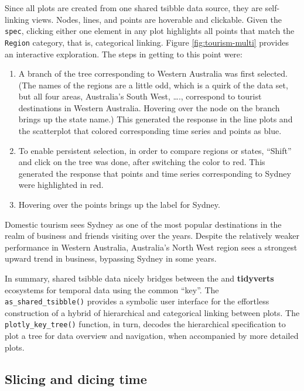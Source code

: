Since all plots are created from one shared tsibble data source, they
are self-linking views. Nodes, lines, and points are hoverable and
clickable. Given the \texttt{spec}, clicking either one element in any
plot highlights all points that match the \texttt{Region} category, that
is, categorical linking. Figure \ref{fig:tourism-multi} provides an
interactive exploration. The steps in getting to this point were:

\begin{enumerate}
\def\labelenumi{\arabic{enumi}.}
\tightlist
\item
  A branch of the tree corresponding to Western Australia was first
  selected. (The names of the regions are a little odd, which is a quirk
  of the data set, but all four areas, Australia's South West, \ldots.,
  correspond to tourist destinations in Western Australia. Hovering over
  the node on the branch brings up the state name.) This generated the
  response in the line plots and the scatterplot that colored
  corresponding time series and points as blue.
\item
  To enable persistent selection, in order to compare regions or states,
  ``Shift'' and click on the tree was done, after switching the color to
  red. This generated the response that points and time series
  corresponding to Sydney were highlighted in red.
\item
  Hovering over the points brings up the label for Sydney.
\end{enumerate}

Domestic tourism sees Sydney as one of the most popular destinations in
the realm of business and friends visiting over the years. Despite the
relatively weaker performance in Western Australia, Australia's North
West region sees a strongest upward trend in business, bypassing Sydney
in some years.

In summary, shared tsibble data nicely bridges between the
 and \textbf{tidyverts} ecosystems for temporal data
using the common ``key''. The \texttt{as\_shared\_tsibble()} provides a
symbolic user interface for the effortless construction of a hybrid of
hierarchical and categorical linking between plots. The
\texttt{plotly\_key\_tree()} function, in turn, decodes the hierarchical
specification to plot a tree for data overview and navigation, when
accompanied by more detailed plots.

\hypertarget{slicing-and-dicing-time}{%
\subsection{Slicing and dicing time}\label{slicing-and-dicing-time}}


